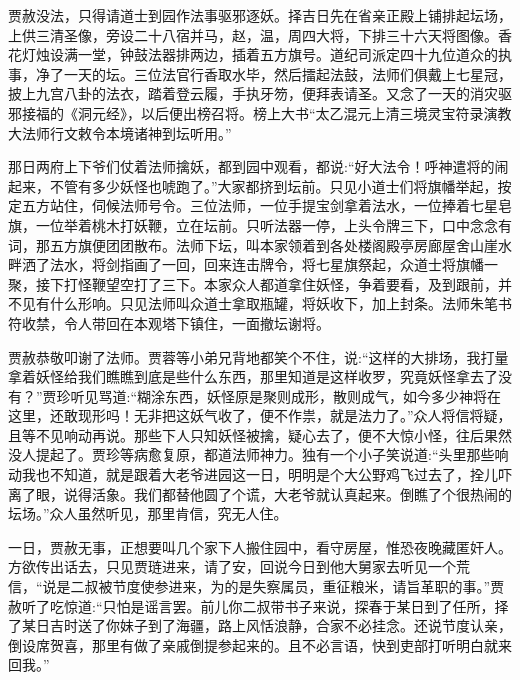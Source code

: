 \begin{parag}
    贾赦没法，只得请道士到园作法事驱邪逐妖。择吉日先在省亲正殿上铺排起坛场，上供三清圣像，旁设二十八宿并马，赵，温，周四大将，下排三十六天将图像。香花灯烛设满一堂，钟鼓法器排两边，插着五方旗号。道纪司派定四十九位道众的执事，净了一天的坛。三位法官行香取水毕，然后擂起法鼓，法师们俱戴上七星冠，披上九宫八卦的法衣，踏着登云履，手执牙笏，便拜表请圣。又念了一天的消灾驱邪接福的《洞元经》，以后便出榜召将。榜上大书“太乙混元上清三境灵宝符录演教大法师行文敕令本境诸神到坛听用。”
\end{parag}


\begin{parag}
    那日两府上下爷们仗着法师擒妖，都到园中观看，都说:“好大法令！呼神遣将的闹起来，不管有多少妖怪也唬跑了。”大家都挤到坛前。只见小道士们将旗幡举起，按定五方站住，伺候法师号令。三位法师，一位手提宝剑拿着法水，一位捧着七星皂旗，一位举着桃木打妖鞭，立在坛前。只听法器一停，上头令牌三下，口中念念有词，那五方旗便团团散布。法师下坛，叫本家领着到各处楼阁殿亭房廊屋舍山崖水畔洒了法水，将剑指画了一回，回来连击牌令，将七星旗祭起，众道士将旗幡一聚，接下打怪鞭望空打了三下。本家众人都道拿住妖怪，争着要看，及到跟前，并不见有什么形响。只见法师叫众道士拿取瓶罐，将妖收下，加上封条。法师朱笔书符收禁，令人带回在本观塔下镇住，一面撤坛谢将。
\end{parag}


\begin{parag}
    贾赦恭敬叩谢了法师。贾蓉等小弟兄背地都笑个不住，说:“这样的大排场，我打量拿着妖怪给我们瞧瞧到底是些什么东西，那里知道是这样收罗，究竟妖怪拿去了没有？”贾珍听见骂道:“糊涂东西，妖怪原是聚则成形，散则成气，如今多少神将在这里，还敢现形吗！无非把这妖气收了，便不作祟，就是法力了。”众人将信将疑，且等不见响动再说。那些下人只知妖怪被擒，疑心去了，便不大惊小怪，往后果然没人提起了。贾珍等病愈复原，都道法师神力。独有一个小子笑说道:“头里那些响动我也不知道，就是跟着大老爷进园这一日，明明是个大公野鸡飞过去了，拴儿吓离了眼，说得活象。我们都替他圆了个谎，大老爷就认真起来。倒瞧了个很热闹的坛场。”众人虽然听见，那里肯信，究无人住。
\end{parag}


\begin{parag}
    一日，贾赦无事，正想要叫几个家下人搬住园中，看守房屋，惟恐夜晚藏匿奸人。方欲传出话去，只见贾琏进来，请了安，回说今日到他大舅家去听见一个荒信，“说是二叔被节度使参进来，为的是失察属员，重征粮米，请旨革职的事。”贾赦听了吃惊道:“只怕是谣言罢。前儿你二叔带书子来说，探春于某日到了任所，择了某日吉时送了你妹子到了海疆，路上风恬浪静，合家不必挂念。还说节度认亲，倒设席贺喜，那里有做了亲戚倒提参起来的。且不必言语，快到吏部打听明白就来回我。”
\end{parag}


